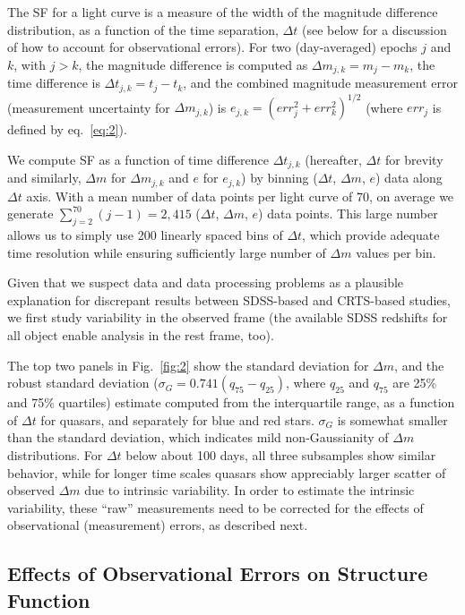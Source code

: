 \documentclass[fleqn,usenatbib]{mnras}
\begin{document}
The SF for a light curve is a measure of the width of the magnitude difference distribution, as a function of the time separation, $\Delta t$ (see below for a discussion of how to account for observational errors). For two (day-averaged) epochs $j$ and $k$,  with $j > k$, the magnitude difference is computed as $\Delta m_{j,k} = m_{j} - m_{k}$, the time difference is  $\Delta t_{j,k} = t_{j} - t_{k}$, and  the combined magnitude measurement error (measurement uncertainty for $\Delta m_{j,k}$) is $e_{j,k} = (err_{j}^{2} + err_{k}^{2})^{1/2}$ (where $err_{j}$ is defined by eq.~\ref{eq:2}). 

We compute SF as a function of time difference $\Delta t_{j,k}$ (hereafter, $\Delta t$ for brevity and similarly, $\Delta m$ for $\Delta m_{j,k}$ and $e$ for $e_{j,k}$) by binning ($\Delta t$, $\Delta m$, $e$) data along $\Delta t$ axis.  With a mean number of data points per light curve of  70, on average we generate $\sum_{j=2}^{70}{(j-1)} = 2,415$  ($\Delta t$, $\Delta m$, $e$) data points. This large number allows us  to simply use 200 linearly spaced bins of $\Delta t$, which provide adequate time resolution while ensuring sufficiently large number of  $\Delta m$ values per bin.

Given that we suspect data and data processing problems as a plausible explanation for discrepant
results between SDSS-based and CRTS-based studies, we first study variability in the observed frame (the available SDSS
redshifts for all object enable analysis in the rest frame, too). 

The top two panels in Fig.~\ref{fig:2} show the standard deviation for $\Delta m$, and the robust standard 
deviation ($\sigma_G=0.741 (q_{75} - q_{25})$, where $q_{25}$ and $q_{75}$ are 25\% and 75\% quartiles) 
estimate computed from the interquartile range, as a function of $\Delta t$ for quasars, and 
separately for blue and red stars. $\sigma_G$ is somewhat smaller than the standard deviation, which indicates mild 
non-Gaussianity of $\Delta m$ distributions. For $\Delta t$ below about 100 days, all three subsamples 
show similar behavior, while for longer time scales quasars show appreciably larger scatter of observed 
$\Delta m$ due to intrinsic variability. In order to estimate the intrinsic variability, these ``raw'' 
measurements need to be corrected for the effects of observational (measurement) errors, as described next.



\subsection{Effects of Observational Errors on Structure Function}
\end{document}

